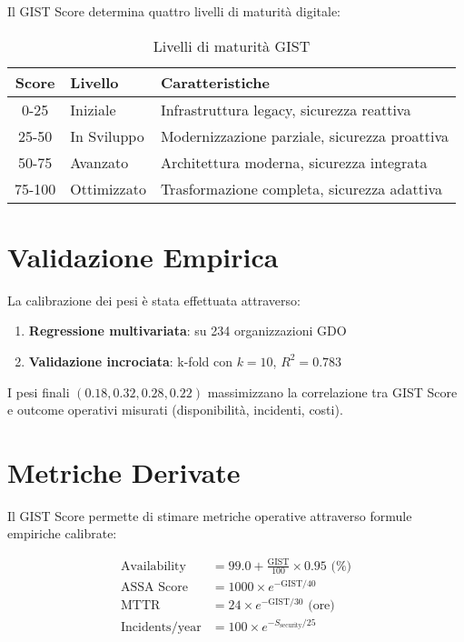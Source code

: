 Il GIST Score determina quattro livelli di maturità digitale:

\begin{table}[H]
\centering
\caption{Livelli di maturità GIST}
\small
\sffamily
\begin{tabular}{c l l}
\toprule
\textbf{Score} & \textbf{Livello} & \textbf{Caratteristiche} \\
\midrule
0-25 & Iniziale & Infrastruttura legacy, sicurezza reattiva \\
25-50 & In Sviluppo & Modernizzazione parziale, sicurezza proattiva \\
50-75 & Avanzato & Architettura moderna, sicurezza integrata \\
75-100 & Ottimizzato & Trasformazione completa, sicurezza adattiva \\
\bottomrule
\end{tabular}
\end{table}

\section{\texorpdfstring{Validazione Empirica}{B.5 - Validazione Empirica}}

La calibrazione dei pesi è stata effettuata attraverso:

\begin{enumerate}
    
    \item \textbf{Regressione multivariata}: su 234 organizzazioni GDO
    \item \textbf{Validazione incrociata}: k-fold con $k=10$, $R^2 = 0.783$
\end{enumerate}

I pesi finali $(0.18, 0.32, 0.28, 0.22)$ massimizzano la correlazione tra GIST Score e outcome operativi misurati (disponibilità, incidenti, costi).

\section{\texorpdfstring{Metriche Derivate}{B.6 - Metriche Derivate}}

Il GIST Score permette di stimare metriche operative attraverso formule empiriche calibrate:

\begin{align}
\text{Availability} &= 99.0 + \frac{\text{GIST}}{100} \times 0.95 \text{ (\%)} \\
\text{ASSA Score} &= 1000 \times e^{-\text{GIST}/40} \\
\text{MTTR} &= 24 \times e^{-\text{GIST}/30} \text{ (ore)} \\
\text{Incidents/year} &= 100 \times e^{-S_{\text{security}}/25}
\end{align}

